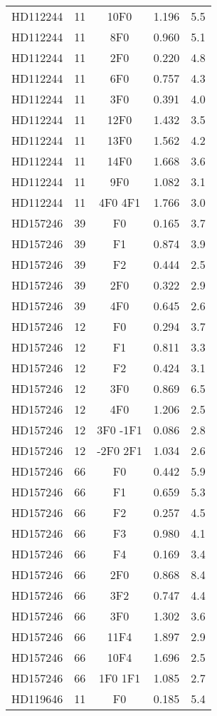 \begin{table*}
\begin{tabular}{l c c c c}
HD112244 & 11 & 10F0 & 1.196 & 5.5\\ 
HD112244 & 11 & 8F0 & 0.960 & 5.1\\ 
HD112244 & 11 & 2F0 & 0.220 & 4.8\\ 
HD112244 & 11 & 6F0 & 0.757 & 4.3\\ 
HD112244 & 11 & 3F0 & 0.391 & 4.0\\ 
HD112244 & 11 & 12F0 & 1.432 & 3.5\\ 
HD112244 & 11 & 13F0 & 1.562 & 4.2\\ 
HD112244 & 11 & 14F0 & 1.668 & 3.6\\ 
HD112244 & 11 & 9F0 & 1.082 & 3.1\\ 
HD112244 & 11 & 4F0 4F1 & 1.766 & 3.0\\ 
\hline
HD157246 & 39 & F0 & 0.165 & 3.7\\ 
HD157246 & 39 & F1 & 0.874 & 3.9\\ 
HD157246 & 39 & F2 & 0.444 & 2.5\\ 
HD157246 & 39 & 2F0 & 0.322 & 2.9\\ 
HD157246 & 39 & 4F0 & 0.645 & 2.6\\ 
\hline
HD157246 & 12 & F0 & 0.294 & 3.7\\ 
HD157246 & 12 & F1 & 0.811 & 3.3\\ 
HD157246 & 12 & F2 & 0.424 & 3.1\\ 
HD157246 & 12 & 3F0 & 0.869 & 6.5\\ 
HD157246 & 12 & 4F0 & 1.206 & 2.5\\ 
HD157246 & 12 & 3F0 -1F1 & 0.086 & 2.8\\ 
HD157246 & 12 & -2F0 2F1 & 1.034 & 2.6\\ 
\hline
HD157246 & 66 & F0 & 0.442 & 5.9\\ 
HD157246 & 66 & F1 & 0.659 & 5.3\\ 
HD157246 & 66 & F2 & 0.257 & 4.5\\ 
HD157246 & 66 & F3 & 0.980 & 4.1\\ 
HD157246 & 66 & F4 & 0.169 & 3.4\\ 
HD157246 & 66 & 2F0 & 0.868 & 8.4\\ 
HD157246 & 66 & 3F2 & 0.747 & 4.4\\ 
HD157246 & 66 & 3F0 & 1.302 & 3.6\\ 
HD157246 & 66 & 11F4 & 1.897 & 2.9\\ 
HD157246 & 66 & 10F4 & 1.696 & 2.5\\ 
HD157246 & 66 & 1F0 1F1 & 1.085 & 2.7\\ 
\hline
HD119646 & 11 & F0 & 0.185 & 5.4\\ 

\end{tabular}
\end{table*}
